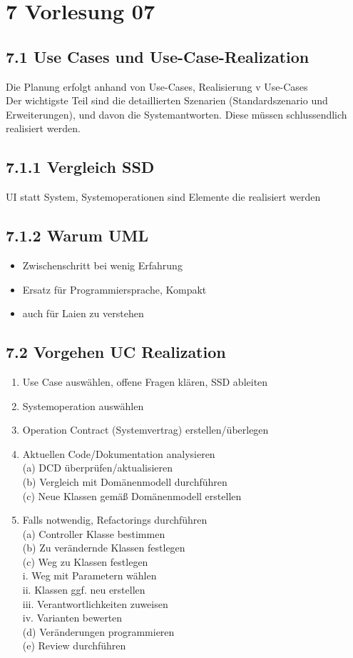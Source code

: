 \documentclass[10pt]{article}
\begin{document}
\section*{7 Vorlesung 07}
\subsection*{7.1 Use Cases und Use-Case-Realization}
Die Planung erfolgt anhand von Use-Cases, Realisierung v Use-Cases\\
Der wichtigste Teil sind die detaillierten Szenarien (Standardszenario und Erweiterungen), und davon die Systemantworten. Diese müssen schlussendlich realisiert werden.

\subsection*{7.1.1 Vergleich SSD}
UI statt System, Systemoperationen sind Elemente die realisiert werden

\subsection*{7.1.2 Warum UML}
\begin{itemize}
  \item Zwischenschritt bei wenig Erfahrung
  \item Ersatz für Programmiersprache, Kompakt
  \item auch für Laien zu verstehen
\end{itemize}

\subsection*{7.2 Vorgehen UC Realization}
\begin{enumerate}
  \item Use Case auswählen, offene Fragen klären, SSD ableiten
  \item Systemoperation auswählen
  \item Operation Contract (Systemvertrag) erstellen/überlegen
  \item Aktuellen Code/Dokumentation analysieren\\
(a) DCD überprüfen/aktualisieren\\
(b) Vergleich mit Domänenmodell durchführen\\
(c) Neue Klassen gemäß Domänenmodell erstellen
  \item Falls notwendig, Refactorings durchführen\\
(a) Controller Klasse bestimmen\\
(b) Zu verändernde Klassen festlegen\\
(c) Weg zu Klassen festlegen\\
i. Weg mit Parametern wählen\\
ii. Klassen ggf. neu erstellen\\
iii. Verantwortlichkeiten zuweisen\\
iv. Varianten bewerten\\
(d) Veränderungen programmieren\\
(e) Review durchführen
\end{enumerate}
\end{document}
